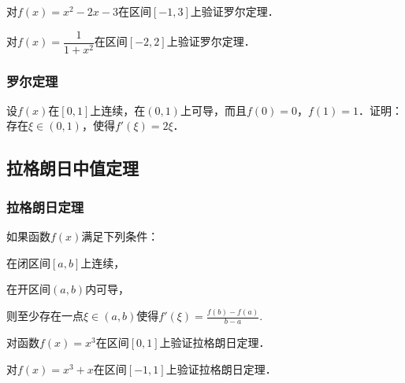 \documentclass[14pt,notheorems,leqno,xcolor={rgb}]{beamer} %
\begin{document}
\begin{frame}
\begin{example}
对$f(x)=x^2-2x-3$在区间$[-1,3]$上验证罗尔定理．
\end{example}%
\vpause
\begin{exercise}
对$f(x)=\dfrac1{1+x^2}$在区间$[-2,2]$上验证罗尔定理．
\end{exercise}
\end{frame}

\begin{frame}
\frametitle{罗尔定理}
\begin{example}
设$f(x)$在$[0,1]$上连续，在$(0,1)$上可导，而且$f(0)=0$，$f(1)=1$．证明：存在$\xi\in(0,1)$，使得$f'(\xi)=2\xi$．
\end{example}
\end{frame}

\subsection{拉格朗日中值定理}

\begin{frame}
\frametitle{拉格朗日定理}
\begin{theorem*}
如果函数$f(x)$满足下列条件：
\begin{enumskip}
\item 在闭区间$[a,b]$上连续，
\item 在开区间$(a,b)$内可导，
\end{enumskip}
则至少存在一点$\xi\in(a,b)$使得$f'(\xi)=\frac{f(b)-f(a)}{b-a}$.
\end{theorem*}
\end{frame}

\begin{frame}
\begin{example}
对函数$f(x)=x^3$在区间$[0,1]$上验证拉格朗日定理．
\end{example}%
\vpause
\begin{exercise}
对$f(x)=x^3+x$在区间$[-1,1]$上验证拉格朗日定理．\\
\end{exercise}
\end{frame}
\end{document}
